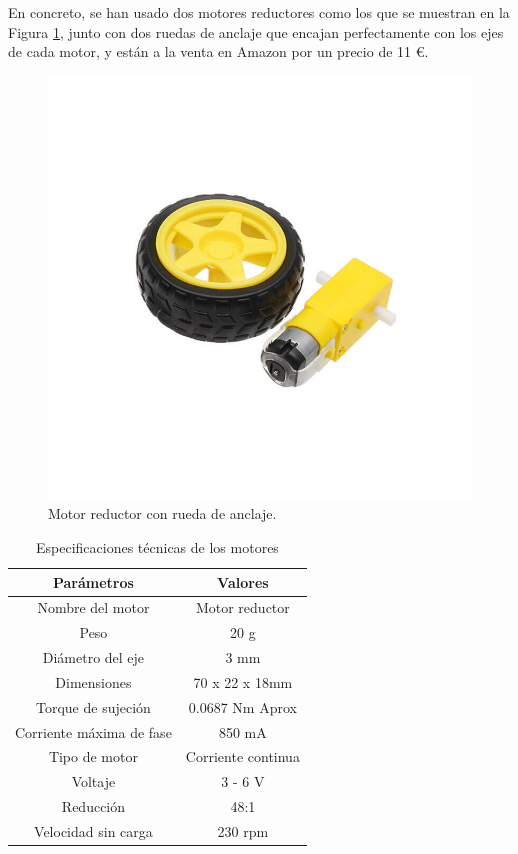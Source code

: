 En concreto, se han usado dos motores reductores como los que se muestran en la Figura \ref{fig:Motor}, junto con dos ruedas de anclaje que encajan perfectamente con los ejes de cada motor, y están a la venta en Amazon por un precio de 11 \euro. 

\begin{figure}[H]
  \centering
  \includegraphics[scale=0.35]{figs/motor} %
  \caption{Motor reductor con rueda de anclaje.}
  \label{fig:Motor}
\end{figure}

\begin{table}[H]
\begin{center}
\begin{tabular}{|c|c|}
\hline
\textbf{Parámetros} & \textbf{Valores} \\
\hline

Nombre del motor & Motor reductor \\
Peso & 20 g \\  
Diámetro del eje & 3 mm \\   
Dimensiones & 70 x 22 x 18mm \\   
Torque de sujeción & 0.0687 Nm Aprox \\
Corriente máxima de fase & 850 mA \\  
Tipo de motor & Corriente continua \\   
Voltaje & 3 - 6 V \\  
Reducción & 48:1 \\ 
Velocidad sin carga & 230 rpm \\ 


\hline
\end{tabular}
\caption{Especificaciones técnicas de los motores}
\label{cuadro:ejemplo}
\end{center}
\end{table}


